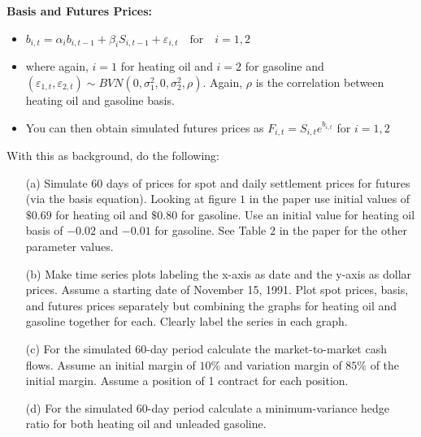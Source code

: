 \documentclass[12pt]{article}
\begin{document}
 \vspace{3mm}
 \textbf{Basis and Futures Prices:}
 \begin{itemize}
  \item $b_{i,t} = \alpha_{i} b_{i,t-1} + \beta_{i} S_{i,t-1} + \varepsilon_{i,t} \quad \mbox{for} \quad i =
	  1,2$
  \item[]
  \item where again, $i = 1$ for heating oil and $i = 2$ for gasoline and $(\varepsilon_{1,t}, \varepsilon_{2,t}) \sim
	      BVN(0, \sigma_{1}^{2}, 0, \sigma_{2}^{2}, \rho)$. Again, $\rho$ is the correlation between heating oil and
		  gasoline basis. 
  \item[]
  \item You can then obtain simulated futures prices as $F_{i,t} = S_{i,t}e^{b_{i,t}}$ for $i = 1,2$
 \end{itemize}

 \vspace{5mm}
 With this as background, do the following:

 \begin{itemize}
  \item[(a)] Simulate 60 days of prices for spot and daily settlement prices for futures (via the basis equation).
	         Looking at figure $1$ in the paper use initial values of $\$0.69$ for heating oil and $\$0.80$ for
			 gasoline. Use an initial value for heating oil basis of $-0.02$ and $-0.01$ for gasoline.
			 See Table $2$ in the paper for the other parameter values. 
  \item[(b)] Make time series plots labeling the x-axis as date and the y-axis as dollar prices. Assume a starting date
	         of November 15, 1991. Plot spot prices, basis, and futures prices separately but combining the graphs for 
			 heating oil and gasoline together for each. Clearly label the series in each graph. 
  \item[(c)] For the simulated 60-day period calculate the market-to-market cash flows. Assume an initial margin
	         of $10\%$ and variation margin of $85\%$ of the initial margin. Assume a position of 1 contract for each
			 position.
  \item[(d)] For the simulated 60-day period calculate a minimum-variance hedge ratio for both heating oil and unleaded
	         gasoline.
 \end{itemize}
\end{document}
